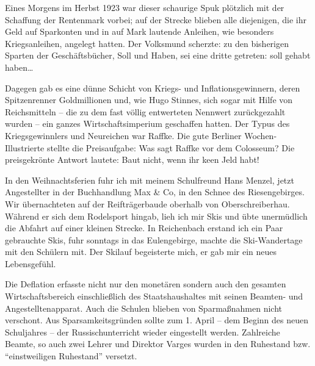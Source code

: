 \documentclass[a5paper,pagesize,10pt,twoside=true]{scrbook}
\renewcommand{\marginpar}[2][]{}
\begin{document}
Eines Morgens im Herbst 1923 war dieser schaurige Spuk plötzlich mit der Schaffung der Rentenmark vorbei; auf der Strecke blieben alle diejenigen, die ihr Geld auf Sparkonten und in auf Mark lautende Anleihen, wie besonders Kriegsanleihen, angelegt hatten. Der Volksmund scherzte: zu den bisherigen Sparten der Geschäftsbücher, Soll und Haben, sei eine dritte getreten: soll gehabt haben\dots

Dagegen gab es eine dünne Schicht von Kriegs- und Inflationsgewinnern, deren Spitzenrenner Goldmillionen und, wie Hugo Stinnes, sich sogar mit Hilfe von Reichsmitteln -- die zu dem fast völlig entwerteten Nennwert zurückgezahlt wurden -- ein ganzes Wirtschaftsimperium geschaffen hatten. Der Typus des Kriegsgewinnlers und Neureichen war Raffke. Die gute Berliner Wochen-Illustrierte stellte die Preisaufgabe: Was sagt Raffke vor dem Colosseum? Die preisgekrönte Antwort lautete: Baut nicht, wenn ihr keen Jeld habt!

In den Weihnachtsferien fuhr ich mit meinem Schulfreund Hans Menzel, jetzt Angestellter in der Buchhandlung Max \& Co, in den Schnee des Riesengebirges. Wir übernachteten auf der Reifträgerbaude oberhalb von Oberschreiberhau. Während er sich dem Rodelsport hingab, lieh ich mir Skis und übte unermüdlich die Abfahrt auf einer kleinen Strecke. In Reichenbach erstand ich ein Paar gebrauchte Skis, fuhr sonntags in das Eulengebirge, machte die Ski-Wandertage mit den Schülern mit. Der Skilauf begeisterte mich, er gab mir ein neues Lebensgefühl.

\marginpar{439}
Die Deflation erfasste nicht nur den monetären sondern auch den gesamten Wirtschaftsbereich einschließlich des Staatshaushaltes mit seinen Beamten- und Angestelltenapparat. Auch die Schulen blieben von Sparmaßnahmen nicht verschont. Aus Sparsamkeitsgründen sollte zum 1. April -- dem Beginn des neuen Schuljahres -- der Russischunterricht wieder eingestellt werden. Zahlreiche Beamte, so auch zwei Lehrer und Direktor Varges wurden in den Ruhestand bzw. \enquote{einstweiligen Ruhestand} versetzt.
\end{document}
